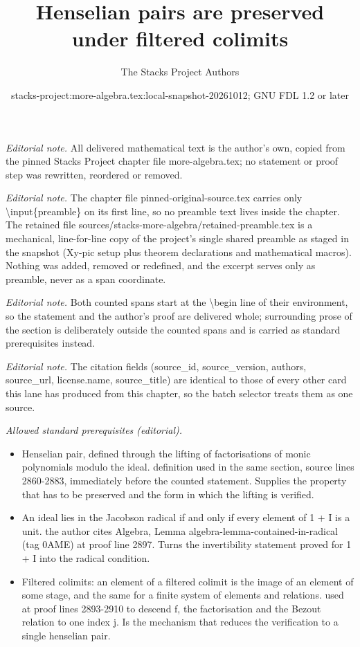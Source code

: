\documentclass[10pt,a4paper]{amsart}
\title{Henselian pairs are preserved under filtered colimits}
\author{The Stacks Project Authors}
\date{stacks-project:more-algebra.tex:local-snapshot-20261012; GNU FDL 1.2 or later}
\theoremstyle{plain}
\theoremstyle{definition}
\theoremstyle{remark}
\numberwithin{equation}{subsection}
\begin{document}
\maketitle
\setcounter{subsection}{1}
\noindent\textit{Editorial note.} All delivered mathematical text is the author's own, copied from the pinned Stacks Project chapter file more-algebra.tex; no statement or proof step was rewritten, reordered or removed.\par\medskip
\noindent\textit{Editorial note.} The chapter file pinned-original-source.tex carries only \textbackslash{}input\{preamble\} on its first line, so no preamble text lives inside the chapter. The retained file sources/stacks-more-algebra/retained-preamble.tex is a mechanical, line-for-line copy of the project's single shared preamble as staged in the snapshot (Xy-pic setup plus theorem declarations and mathematical macros). Nothing was added, removed or redefined, and the excerpt serves only as preamble, never as a span coordinate.\par\medskip
\noindent\textit{Editorial note.} Both counted spans start at the \textbackslash{}begin line of their environment, so the statement and the author's proof are delivered whole; surrounding prose of the section is deliberately outside the counted spans and is carried as standard prerequisites instead.\par\medskip
\noindent\textit{Editorial note.} The citation fields (source\_id, source\_version, authors, source\_url, license.name, source\_title) are identical to those of every other card this lane has produced from this chapter, so the batch selector treats them as one source.\par\medskip
\noindent\textit{Allowed standard prerequisites (editorial).}\begin{itemize}
\item Henselian pair, defined through the lifting of factorisations of monic polynomials modulo the ideal. definition used in the same section, source lines 2860-2883, immediately before the counted statement. Supplies the property that has to be preserved and the form in which the lifting is verified.
\item An ideal lies in the Jacobson radical if and only if every element of 1 + I is a unit. the author cites Algebra, Lemma algebra-lemma-contained-in-radical (tag 0AME) at proof line 2897. Turns the invertibility statement proved for 1 + I into the radical condition.
\item Filtered colimits: an element of a filtered colimit is the image of an element of some stage, and the same for a finite system of elements and relations. used at proof lines 2893-2910 to descend f, the factorisation and the Bezout relation to one index j. Is the mechanism that reduces the verification to a single henselian pair.
\end{itemize}\medskip
\end{document}
